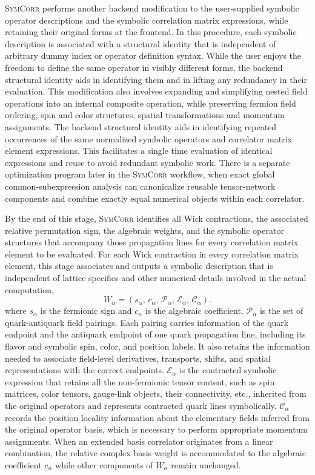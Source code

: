 \documentclass[a4paper,fleqn]{cas-dc}
\begin{document}
\textsc{SymCorr} performs another backend modification to the user-supplied symbolic operator descriptions and the symbolic correlation matrix expressions, while retaining their original forms at the frontend. In this procedure, each symbolic description is associated with a structural identity that is independent of arbitrary dummy index or operator definition syntax. While the user enjoys the freedom to define the same operator in visibly different forms, the backend structural identity aids in identifying them and in lifting any redundancy in their evaluation. This modification also involves expanding and simplifying nested field operations into an internal composite operation, while preserving fermion field ordering, spin and color structures, spatial transformations and momentum assignments. The backend structural identity aids in identifying repeated occurrences of the same normalized symbolic operators and correlator matrix element expressions. This facilitates a single time evaluation of identical expressions and reuse to avoid redundant symbolic work. There is a separate optimization program later in the \textsc{SymCorr} workflow, when exact global common-subexpression analysis can canonicalize reusable tensor-network components and combine exactly equal numerical objects within each correlator. 

By the end of this stage, \textsc{SymCorr} identifies all Wick contractions, the associated relative permutation sign, the algebraic weights, and the symbolic operator structures that accompany those propagation lines for every correlation matrix element to be evaluated.  For each Wick contraction in every correlation matrix element, this stage associates and outputs a symbolic description that is independent of lattice specifics and other numerical details involved in the actual computation, 
\begin{equation}
W_\alpha =\left( s_\alpha, \,c_\alpha,\, \mathcal P_\alpha,\, \mathcal E_\alpha,\, \mathcal C_\alpha\right).
\label{eq:wick_term_contents}
\end{equation}
where $s_\alpha$ is the fermionic sign and $c_\alpha$ is the algebraic coefficient. $\mathcal P_\alpha$ is the set of quark-antiquark field pairings. Each pairing carries information of the quark endpoint and the antiquark endpoint of one quark propagation line, including its flavor and symbolic spin, color, and position labels. It also retains the information needed to associate field-level derivatives, transports, shifts, and spatial representations with the correct endpoints. $\mathcal E_\alpha$ is the contracted symbolic expression that retains all the non-fermionic tensor content, such as spin matrices, color tensors, gauge-link objects, their connectivity, etc., inherited from the original operators and represents contracted quark lines symbolically. $\mathcal C_\alpha$ records the position locality information about the elementary fields inferred from the original operator basis, which is necessary to perform appropriate momentum assignments. When an extended basis correlator originates from a linear combination, the relative complex basis weight is accommodated to the algebraic coefficient $c_\alpha$ while other components of $W_\alpha$ remain unchanged. 
\end{document}
